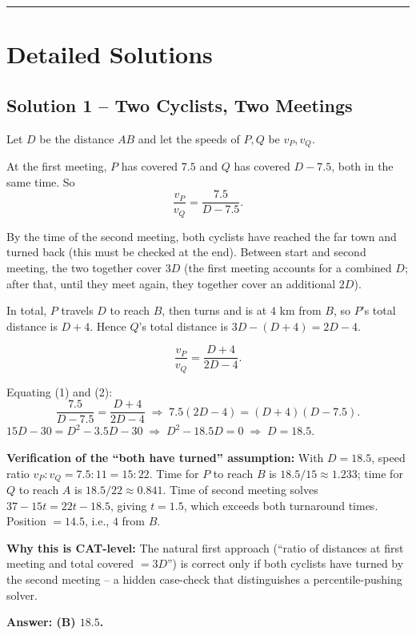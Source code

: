 \documentclass[11pt,a4paper]{article}
\begin{document}
\vspace{0.4em}\hrule\vspace{0.6em}

\section*{Detailed Solutions}

\subsection*{Solution 1 -- Two Cyclists, Two Meetings}
Let $D$ be the distance $AB$ and let the speeds of $P, Q$ be $v_P, v_Q$.

At the first meeting, $P$ has covered $7.5$ and $Q$ has covered $D-7.5$, both in the same time. So
\[
\frac{v_P}{v_Q}=\frac{7.5}{D-7.5}. \tag{1}
\]

By the time of the second meeting, both cyclists have reached the far town and turned back (this must be checked at the end). Between start and second meeting, the two together cover $3D$ (the first meeting accounts for a combined $D$; after that, until they meet again, they together cover an additional $2D$).

In total, $P$ travels $D$ to reach $B$, then turns and is at $4$ km from $B$, so $P$'s total distance is $D + 4$. Hence $Q$'s total distance is $3D - (D+4) = 2D - 4$.

\[
\frac{v_P}{v_Q}=\frac{D+4}{2D-4}. \tag{2}
\]

Equating (1) and (2):
\[
\frac{7.5}{D-7.5}=\frac{D+4}{2D-4}
\;\Longrightarrow\; 7.5(2D-4)=(D+4)(D-7.5).
\]
$15D-30 = D^2 - 3.5D - 30 \;\Longrightarrow\; D^2 - 18.5D = 0 \;\Longrightarrow\; D = 18.5.$

\textbf{Verification of the ``both have turned'' assumption:} With $D=18.5$, speed ratio $v_P:v_Q = 7.5:11 = 15:22$. Time for $P$ to reach $B$ is $18.5/15 \approx 1.233$; time for $Q$ to reach $A$ is $18.5/22 \approx 0.841$. Time of second meeting solves $37 - 15t = 22t - 18.5$, giving $t=1.5$, which exceeds both turnaround times. Position $= 14.5$, i.e., $4$ from $B$. \checkmark

\textbf{Why this is CAT-level:} The natural first approach (``ratio of distances at first meeting and total covered $=3D$'') is correct only if both cyclists have turned by the second meeting -- a hidden case-check that distinguishes a percentile-pushing solver.

\textbf{Answer: (B) $18.5$.}
\end{document}

